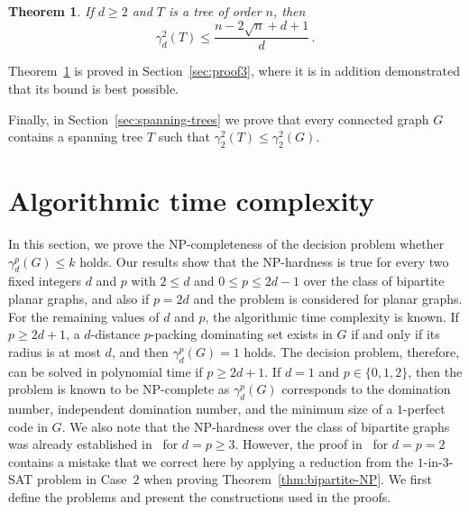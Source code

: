 \documentclass[12pt]{article}
\newtheorem{theorem}{Theorem}[section]
\newcommand{\mrho}{\gamma_2^2}
\begin{document}
\begin{theorem}
\label{thm:trees-upper-bound-gamma_d^2}
If $d \geq 2$ and $T$ is a tree of order $n$, then 
$$\gamma_d^2(T) \leq \frac{n-2\sqrt{n}+d+1}{d}\,.$$
\end{theorem}

Theorem~\ref{thm:trees-upper-bound-gamma_d^2} is proved in Section~\ref{sec:proof3}, where it is in addition demonstrated that its bound is best possible. 

Finally, in Section~\ref{sec:spanning-trees} we prove that every connected graph $G$ contains a spanning tree $T$ such that $\mrho(T) \leq \mrho(G)$.


\section{Algorithmic time complexity}
\label{sec:complexity}

In this section, we prove the NP-completeness of the decision problem whether $\gamma_d^p(G) \leq k$ holds. Our results show that the NP-hardness is true for every two fixed integers $d$ and $p$ with $2 \le d$ and $0 \le p \leq 2d-1$ over the class of bipartite planar graphs, and also if $p=2d$ and the problem is considered for planar graphs. For the remaining values of $d$ and $p$, the algorithmic time complexity is known. If $p \ge 2d+1$, a $d$-distance $p$-packing dominating set exists in $G$ if and only if its radius is at most $d$, and then $\gamma_d^p (G) =1$ holds. The decision problem, therefore, can be solved in polynomial time if $p \ge 2d+1$. If $d=1$ and $p \in \{0,1,2\}$, then the problem is known to be NP-complete as $\gamma_d^p(G)$ corresponds to the domination number, independent domination number, and the minimum size of a $1$-perfect code in $G$. We also note that the NP-hardness over the class of bipartite graphs was already established in~\cite{Fricke} for $d=p \ge 3$. However, the proof in~\cite{Fricke} for $d=p=2$ contains a mistake that we correct here by applying a reduction from the $1$-in-$3$-SAT problem in Case~$2$ when proving Theorem~\ref{thm:bipartite-NP}. 
We first define the problems and present the constructions used in the proofs.
\end{document}
